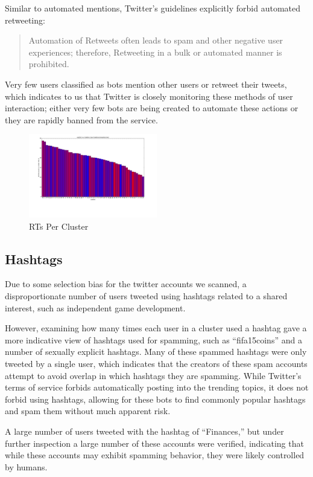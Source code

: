 \documentclass{sig-alternate-05-2015}
\begin{document}
Similar to automated mentions, Twitter's guidelines explicitly forbid automated retweeting:

\begin{quote}Automation of Retweets often leads to spam and other negative user experiences; therefore, Retweeting in a bulk or automated manner is prohibited.\cite{twitter:automation}\end{quote}

Very few users classified as bots mention other users or retweet their tweets, which indicates to us that Twitter is closely monitoring these methods of user interaction; either very few bots are being created to automate these actions or they are rapidly banned from the service.

\begin{figure}[h!]
	\caption{RTs Per Cluster}
	\centering
		\includegraphics[width=0.5\textwidth]{imgs/acctsrtpercluster}
\end{figure}

\subsection{Hashtags}

Due to some selection bias for the twitter accounts we scanned, a disproportionate number of users tweeted using hashtags related to a shared interest, such as independent game development.

However, examining how many times each user in a cluster used a hashtag gave a more indicative view of hashtags used for spamming, such as ``fifa15coins'' and a number of sexually explicit hashtags. Many of these spammed hashtags were only tweeted by a single user, which indicates that the creators of these spam accounts attempt to avoid overlap in which hashtags they are spamming. While Twitter's terms of service forbids automatically posting into the trending topics, it does not forbid using hashtags, allowing for these bots to find commonly popular hashtags and spam them without much apparent risk.

A large number of users tweeted with the hashtag of ``Finances,'' but under further inspection a large number of these accounts were verified, indicating that while these accounts may exhibit spamming behavior, they were likely controlled by humans.
\end{document}
